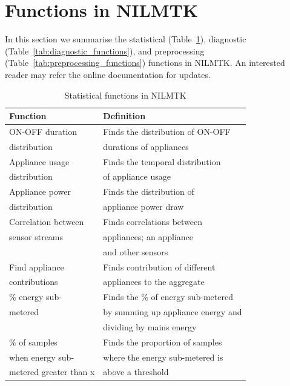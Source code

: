 \documentclass{sig-alternate}
\newcommand{\tabref}[1]{Table~\ref{#1}}
\begin{document}
\section{Functions in NILMTK}
\label{app:functions}
In this section we summarise the statistical (\tabref{tab:stats_functions}), diagnostic (\tabref{tab:diagnostic_functions}), and preprocessing (\tabref{tab:preprocessing_functions}) functions in NILMTK. An interested reader may refer the online documentation for updates.
\begin{table}
    \small
    \begin{tabular}{ll}
    \hline
    \textbf{Function} & \textbf{Definition} \\ \hline
    ON-OFF duration       & Finds the distribution of ON-OFF\\
    distribution          &durations of appliances\\ \hline
    Appliance usage       & Finds the temporal distribution\\
    distribution          & of appliance usage\\ \hline
    Appliance power       & Finds the distribution of\\
    distribution          & appliance power draw\\ \hline
    Correlation between   & Finds correlations between\\ 
    sensor streams        & appliances; an appliance \\
                          & and other sensors\\ \hline  
    Find appliance        & Finds contribution of different\\
    contributions         & appliances to the aggregate\\ \hline
    $\%$ energy sub-       & Finds the $\%$ of energy sub-metered\\
    metered               &  by summing up appliance energy and \\
                          &  dividing by mains energy\\ \hline
    $\%$ of samples      & Finds the proportion of samples\\
    when energy sub-  & where the energy sub-metered is \\ 
    metered greater than x &above a threshold\\ \hline
                                                          
    \end{tabular}
    \caption{Statistical functions in NILMTK}
  \label{tab:stats_functions}
\end{table}
 
\end{document}
